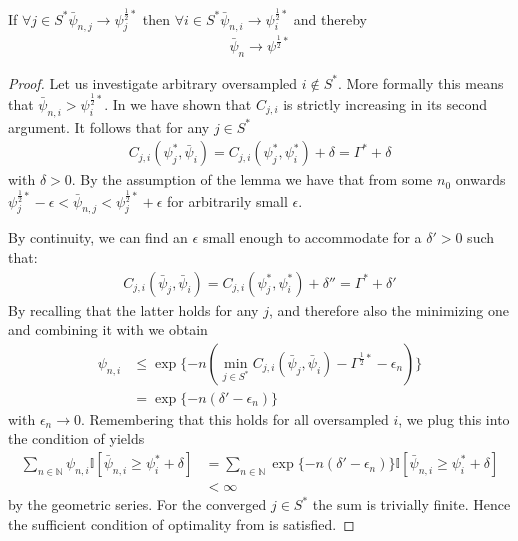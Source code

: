 \textbf{}
If $\forall j \in S^* \bar{\psi}_{n, j} \rightarrow \psi^{\frac{1}{2}*}_j$
then $\forall i \in S^* \bar{\psi}_{n, i} \rightarrow \psi^{\frac{1}{2}*}_i$
and thereby
\begin{align}
  \bar{\psi}_n \rightarrow \psi^{\frac{1}{2}*}
\end{align}
\begin{proof}
  Let us investigate arbitrary oversampled $i \notin S^*$. More formally this
  means that $\bar{\psi}_{n, i} > \psi^{\frac{1}{2}*}_i$. In
   we have shown that $C_{j, i}$ is strictly
  increasing in its second argument. It follows that for any $j \in S^*$
  \begin{align}
    C_{j, i}(\psi_j^*, \bar{\psi}_i) = C_{j, i}(\psi_j^*, \psi_i^*) + \delta = \Gamma^* + \delta
  \end{align}
  with $\delta > 0$. By the assumption of the lemma we have that from
  some $n_0$ onwards $\psi^{\frac{1}{2}*}_j - \epsilon < \bar{\psi}_{n,
  j} < \psi^{\frac{1}{2}*}_j + \epsilon$ for arbitrarily small $\epsilon$.

  By continuity, we can find an $\epsilon$ small enough to accommodate for a $\delta' > 0$ such that:
  \begin{align}
    C_{j, i}(\bar{\psi}_j, \bar{\psi}_i) = C_{j, i}(\psi_j^*, \psi_i^*) + \delta'' = \Gamma^* + \delta'
  \end{align}
  By recalling that the latter holds for any $j$, and therefore also the minimizing one and combining it with  we obtain
  \begin{align}
    \psi_{n, i} &\leq \exp\{-n( \min_{j \in S^*} C_{j, i}(\bar{\psi}_j,
        \bar{\psi}_i) - \Gamma^{\frac{1}{2}*} - \epsilon_n) \}\\
      &= \exp\{-n(\delta' - \epsilon_n)\}
  \end{align}
  with $\epsilon_n \rightarrow 0$. Remembering that this holds for all oversampled $i$, we plug this into the condition of  yields
  \begin{align}
    \sum_{n \in \mathbb{N}} \psi_{n, i}
        \mathbb{I}[\bar{\psi}_{n, i} \geq \psi^*_i + \delta]
      &= \sum_{n \in \mathbb{N}} \exp\{-n(\delta' - \epsilon_n)\}
          \mathbb{I}[\bar{\psi}_{n, i} \geq \psi^*_i + \delta] \\
      &< \infty
  \end{align}
  by the geometric series. For the converged $j \in S^*$ the sum is trivially finite. Hence the sufficient condition of optimality from  is satisfied.
\end{proof}

